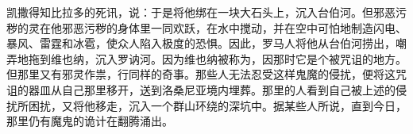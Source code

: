 凯撒得知比拉多的死讯，说：于是将他绑在一块大石头上，沉入台伯河。但邪恶污秽的灵在他邪恶污秽的身体里一同欢跃，在水中搅动，并在空中可怕地制造闪电、暴风、雷霆和冰雹，使众人陷入极度的恐惧。因此，罗马人将他从台伯河捞出，嘲弄地拖到维也纳，沉入罗讷河。因为维也纳被称为，因那时它是个被咒诅的地方。但那里又有邪灵作祟，行同样的奇事。那些人无法忍受这样鬼魔的侵扰，便将这咒诅的器皿从自己那里移开，送到洛桑尼亚境内埋葬。那里的人看到自己被上述的侵扰所困扰，又将他移走，沉入一个群山环绕的深坑中。据某些人所说，直到今日，那里仍有魔鬼的诡计在翻腾涌出。\par

